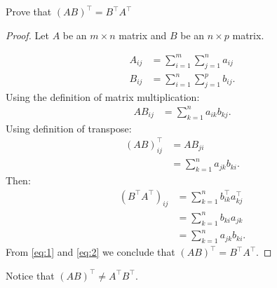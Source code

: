 \documentclass{zc-ust-hw}
\begin{document}
\maketitle

Prove that $(AB)^\intercal=B^\intercal A^\intercal$ \\

\begin{proof}
  Let $A$ be an $m\times n$ matrix and $B$ be an $n\times p$ matrix.

  \begin{align}
    A_{ij} &= \sum_{i=1}^m \sum_{j=1}^n a_{ij} \\
    B_{ij} &= \sum_{i=1}^n \sum_{j=1}^p b_{ij}
  .\end{align}
  Using the definition of matrix multiplication:
  \begin{align}
    AB_{ij} &= \sum_{k=1}^n a_{ik}b_{kj}
  .\end{align}
  Using definition of transpose:
  \begin{align}
    (AB)^\intercal_{ij} &= AB_{ji} \\
                        &= \sum_{k=1}^n a_{jk}b_{ki} \label{eq:1}
  .\end{align}
  Then:
  \begin{align}
    (B^\intercal A^\intercal)_{ij} &= \sum_{k=1}^n b_{ik}^\intercal a_{kj}^\intercal \\
                                   &= \sum_{k=1}^n b_{ki}a_{jk} \\
                                   &= \sum_{k=1}^n a_{jk}b_{ki} \label{eq:2}
  .\end{align}
  From \eqref{eq:1} and \eqref{eq:2} we conclude that $(AB)^\intercal=B^\intercal A^\intercal$.
\end{proof}
\vspace{1em}
Notice that $(AB)^\intercal\neq A^\intercal B^\intercal$.
\end{document}
